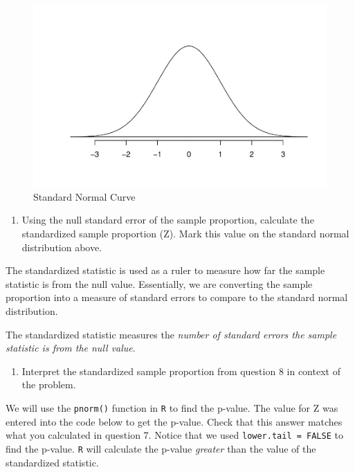 \documentclass[
]{report}
\providecommand{\tightlist}{%
  \setlength{\itemsep}{0pt}\setlength{\parskip}{0pt}}
\begin{document}
\begin{figure}

{\centering \includegraphics[width=0.5\linewidth]{07-OCA05-inference-1cat_test-theory_files/figure-latex/Normalcur-1} 

}

\caption{Standard Normal Curve}\label{fig:Normalcur}
\end{figure}

\begin{enumerate}
\def\labelenumi{\arabic{enumi}.}
\setcounter{enumi}{7}
\tightlist
\item
  Using the null standard error of the sample proportion, calculate the standardized sample proportion (Z). Mark this value on the standard normal distribution above.
\end{enumerate}

\vspace{0.6in}

The standardized statistic is used as a ruler to measure how far the sample statistic is from the null value. Essentially, we are converting the sample proportion into a measure of standard errors to compare to the standard normal distribution.

The standardized statistic measures the \emph{number of standard errors the sample statistic is from the null value}.

\begin{enumerate}
\def\labelenumi{\arabic{enumi}.}
\setcounter{enumi}{8}
\tightlist
\item
  Interpret the standardized sample proportion from question 8 in context of the problem.
\end{enumerate}

\vspace{.8in}

We will use the \texttt{pnorm()} function in \texttt{R} to find the p-value. The value for Z was entered into the code below to get the p-value. Check that this answer matches what you calculated in question 7. Notice that we used \texttt{lower.tail\ =\ FALSE} to find the p-value. \texttt{R} will calculate the p-value \emph{greater} than the value of the standardized statistic.
\end{document}
